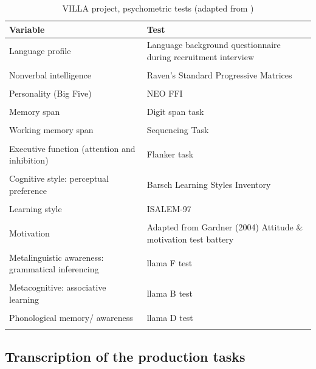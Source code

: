 \begin{table}
\small
    \begin{tabularx}{\textwidth}{XX}
    \lsptoprule
        Variable & Test\\
    \midrule
        Language profile & Language background questionnaire during recruitment interview\\
        \\[-1em]
        Nonverbal intelligence & Raven’s Standard Progressive Matrices\\
        \\[-1em]
        Personality (Big Five) & NEO FFI\\
        \\[-1em]
        Memory span & Digit span task\\
        \\[-1em]
        Working memory span & Sequencing Task\\
        \\[-1em]
        Executive function (attention and inhibition) & Flanker task\\
        \\[-1em]
        Cognitive style: perceptual preference & Barsch Learning Styles Inventory\\
        \\[-1em]
        Learning style & ISALEM-97\\
        \\[-1em]
        Motivation & Adapted from Gardner (2004) Attitude \& motivation test battery\\
        \\[-1em]
        Metalinguistic awareness: grammatical inferencing & llama F test \citep{Meara2005}\\
        \\[-1em]
        Metacognitive: associative learning & llama B test \citep{Meara2005}\\
        \\[-1em]
        Phonological memory/ awareness & llama D test \citep{Meara2005}\\
    \lspbottomrule
    \end{tabularx}
    \caption{VILLA project, psychometric tests (adapted from \citealt[125]{DimrothEtAl2013})}
    \label{tab:02:10}
\end{table}

\subsection{Transcription of the production tasks}\label{sec:02:4.1}

